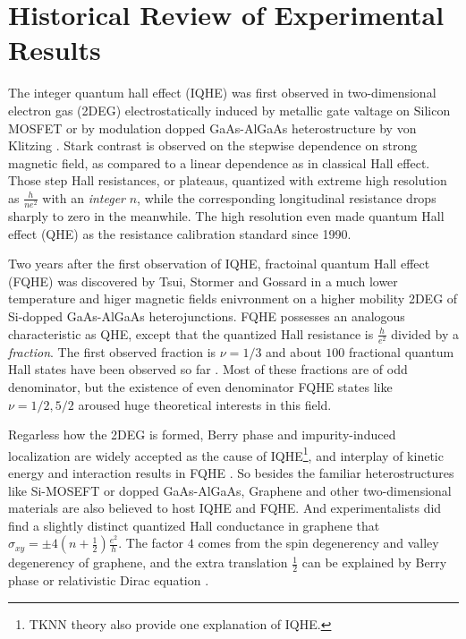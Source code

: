 \documentclass[bachelor,english,numbers]{ustcthesis}
\begin{document}
	\section{Historical Review of Experimental Results}
		\indent\par The integer quantum hall effect (IQHE) was first observed in two-dimensional electron gas (2DEG) electrostatically induced by metallic gate valtage on Silicon MOSFET or by modulation dopped GaAs-AlGaAs heterostructure by von Klitzing \cite{klitzing1980new,von1986quantized,comtet2000aspects}. Stark contrast is observed on the stepwise dependence on strong magnetic field, as compared to a linear dependence as in classical Hall effect. Those step Hall resistances, or plateaus, quantized with extreme high resolution as $\frac{h}{ne^2}$ with an \emph{integer} $n$, while the corresponding longitudinal resistance drops sharply to zero in the meanwhile. The high resolution even made quantum Hall effect (QHE) as the resistance calibration standard since 1990.\par

		Two years after the first observation of IQHE, fractoinal quantum Hall effect (FQHE) was discovered by Tsui, Stormer and Gossard \cite{tsui1982two,stormer1999fractional} in a much lower temperature and higer magnetic fields enivronment on a higher mobility 2DEG of Si-dopped GaAs-AlGaAs heterojunctions. FQHE possesses an analogous characteristic as QHE, except that the quantized Hall resistance is $\frac{h}{e^2}$ divided by a \emph{fraction}. The first observed fraction is $\nu=1/3$ and about $100$ fractional quantum Hall states have been observed so far \cite{laughlin1983anomalous}. Most of these fractions are of odd denominator, but the existence of even denominator FQHE states like $\nu=1/2,5/2$ aroused huge theoretical interests in this field.\par
		
		Regarless how the 2DEG is formed, Berry phase and impurity-induced localization \cite{von1986quantized,tong2016lectures} are widely accepted as the cause of IQHE\footnote{TKNN theory \cite{tong2016lectures} also provide one explanation of IQHE.}, and interplay of kinetic energy and interaction results in FQHE \cite{simon1998chern}. So besides the familiar heterostructures like Si-MOSEFT or dopped GaAs-AlGaAs, Graphene and other two-dimensional materials are also believed to host IQHE and FQHE. And experimentalists did find a slightly distinct quantized Hall conductance in graphene \cite{zhang2005experimental} that $\sigma_{xy}=\pm4(n+\frac{1}{2})\frac{e^2}{h}$. The factor $4$ comes from the spin degenerency and valley degenerency of graphene, and the extra translation $\frac{1}{2}$ can be explained by Berry phase or relativistic Dirac equation \cite{sarma2011electronic}.\par
\end{document}
